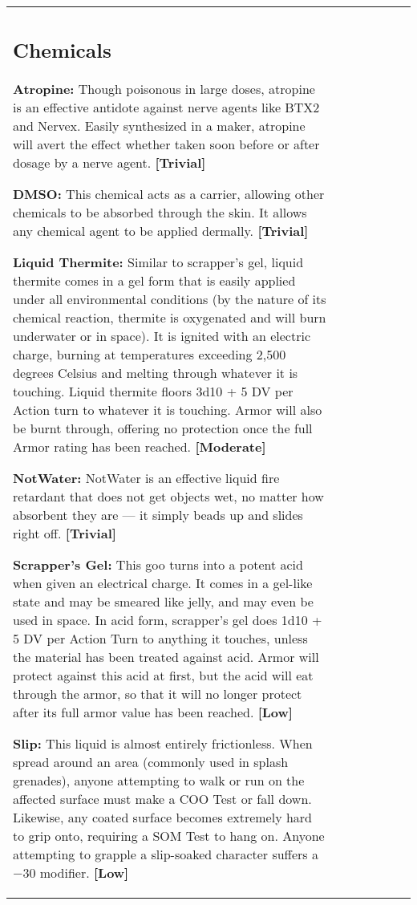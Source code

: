 \begin{tabular}{|l|l|l|l|l|l|l|}
\subsection{Chemicals} \label{sec:chemicals} 

\textbf{Atropine:} Though poisonous in large doses, atropine is an effective antidote against nerve agents like BTX2 and Nervex. Easily synthesized in a maker, atropine will avert the effect whether taken soon before or after dosage by a nerve agent. \textbf{[Trivial]} 

\textbf{DMSO:} This chemical acts as a carrier, allowing other chemicals to be absorbed through the skin. It allows any chemical agent to be applied dermally. \textbf{[Trivial]} 

\textbf{Liquid Thermite:} Similar to scrapper’s gel, liquid thermite comes in a gel form that is easily applied under all environmental conditions (by the nature of its chemical reaction, thermite is oxygenated and will burn underwater or in space). It is ignited with an electric charge, burning at temperatures exceeding 2,500 degrees Celsius and melting through whatever it is touching. Liquid thermite floors 3d10 + 5 DV per Action turn to whatever it is touching. Armor will also be burnt through, offering no protection once the full Armor rating has been reached. \textbf{[Moderate]} 

\textbf{NotWater:} NotWater is an effective liquid fire retardant that does not get objects wet, no matter how absorbent they are --- it simply beads up and slides right off. \textbf{[Trivial]} 

\textbf{Scrapper’s Gel:} This goo turns into a potent acid when given an electrical charge. It comes in a gel-like state and may be smeared like jelly, and may even be used in space. In acid form, scrapper’s gel does 1d10 + 5 DV per Action Turn to anything it touches, unless the material has been treated against acid. Armor will protect against this acid at first, but the acid will eat through the armor, so that it will no longer protect after its full armor value has been reached. \textbf{[Low]} 

\textbf{Slip:} This liquid is almost entirely frictionless. When spread around an area (commonly used in splash grenades), anyone attempting to walk or run on the affected surface must make a COO Test or fall down. Likewise, any coated surface becomes extremely hard to grip onto, requiring a SOM Test to hang on. Anyone attempting to grapple a slip-soaked character suffers a $-$30 modifier. \textbf{[Low]} 


\end{tabular}
